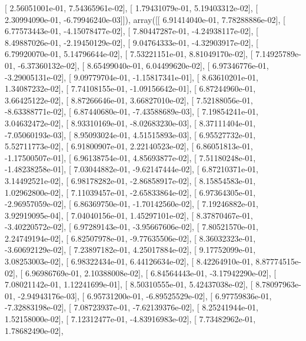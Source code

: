 \documentclass{article}
\begin{document}
       [  2.56051001e-01,   7.54365961e-02],
       [  1.79431079e-01,   5.19403312e-02],
       [  2.30994090e-01,  -6.79946240e-03]]), array([[  6.91414040e-01,   7.78288886e-02],
       [  6.77573443e-01,  -4.15078477e-02],
       [  7.80447287e-01,  -4.24938117e-02],
       [  8.49887026e-01,  -2.19450129e-02],
       [  9.04764333e-01,  -4.32903917e-02],
       [  6.79920070e-01,   5.14796644e-02],
       [  7.53221151e-01,   8.81049170e-02],
       [  7.14925789e-01,  -6.37360132e-02],
       [  8.65499040e-01,   6.04499620e-02],
       [  6.97346776e-01,  -3.29005131e-02],
       [  9.09779704e-01,  -1.15817341e-01],
       [  8.63610201e-01,   1.34087232e-02],
       [  7.74108155e-01,  -1.09156642e-01],
       [  6.87244960e-01,   3.66425122e-02],
       [  8.87266646e-01,   3.66827010e-02],
       [  7.52188056e-01,  -8.63388771e-02],
       [  6.87440680e-01,  -7.43588689e-03],
       [  7.19854241e-01,   3.04632472e-02],
       [  8.93310169e-01,  -8.02683230e-03],
       [  8.37111404e-01,  -7.05060193e-03],
       [  8.95093024e-01,   4.51515893e-03],
       [  6.95527732e-01,   5.52711773e-02],
       [  6.91800907e-01,   2.22140523e-02],
       [  6.86051813e-01,  -1.17500507e-01],
       [  6.96138754e-01,   4.85693877e-02],
       [  7.51180248e-01,  -1.48238258e-01],
       [  7.03044882e-01,  -9.62147444e-02],
       [  6.87210371e-01,   3.14492521e-02],
       [  6.98178282e-01,  -2.86858917e-02],
       [  8.15854583e-01,   1.02962800e-02],
       [  7.11039457e-01,  -2.65833864e-02],
       [  6.97364305e-01,  -2.96957059e-02],
       [  6.86369750e-01,  -1.70142560e-02],
       [  7.19246882e-01,   3.92919095e-04],
       [  7.04040156e-01,   1.45297101e-02],
       [  8.37870467e-01,  -3.40220572e-02],
       [  6.97289143e-01,  -3.95667606e-02],
       [  7.80521570e-01,   2.24749194e-02],
       [  6.82507978e-01,  -9.77635506e-02],
       [  8.36032323e-01,  -3.60692129e-02],
       [  7.23897182e-01,   4.25017884e-02],
       [  9.17752099e-01,   3.08253003e-02],
       [  6.98322434e-01,   6.44126634e-02],
       [  8.42264910e-01,   8.87774515e-02],
       [  6.96986769e-01,   2.10388008e-02],
       [  6.84564443e-01,  -3.17942290e-02],
       [  7.08021142e-01,   1.12241699e-01],
       [  8.50310555e-01,   5.42437038e-02],
       [  8.78097963e-01,  -2.94943176e-03],
       [  6.95731200e-01,  -6.89525529e-02],
       [  6.97759836e-01,  -7.32883198e-02],
       [  7.08723937e-01,  -7.62139376e-02],
       [  8.25241944e-01,   1.52158000e-02],
       [  7.12312477e-01,  -4.83916983e-02],
       [  7.73482962e-01,   1.78682490e-02],
\end{document}
